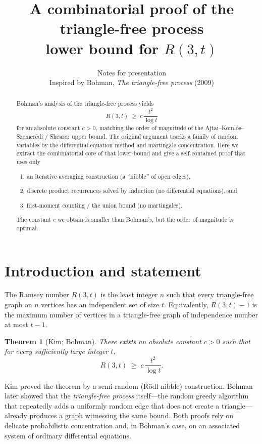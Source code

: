 \documentclass[11pt]{article}
\title{A combinatorial proof of the triangle-free process\\ lower bound for $R(3,t)$}
\author{Notes for presentation\\[0.5em]
\large Inspired by Bohman, \emph{The triangle-free process} (2009)}
\date{}
\newtheorem{theorem}{Theorem}
\theoremstyle{definition}
\begin{document}
\maketitle

\begin{abstract}
Bohman's analysis of the triangle-free process yields
\[
  R(3,t)\;\ge\; c\,\frac{t^{2}}{\log t}
\]
for an absolute constant $c>0$, matching the order of magnitude of the Ajtai--Koml\'os--Szemer\'edi / Shearer upper bound.
The original argument tracks a family of random variables by the differential-equation method and martingale concentration.
Here we extract the combinatorial core of that lower bound and give a self-contained proof that uses only
\begin{enumerate}
  \item an iterative averaging construction (a ``nibble'' of open edges),
  \item discrete product recurrences solved by induction (no differential equations), and
  \item first-moment counting / the union bound (no martingales).
\end{enumerate}
The constant $c$ we obtain is smaller than Bohman's, but the order of magnitude is optimal.
\end{abstract}

\section{Introduction and statement}

The Ramsey number $R(3,t)$ is the least integer $n$ such that every triangle-free graph on $n$ vertices has an independent set of size $t$.
Equivalently, $R(3,t)-1$ is the maximum number of vertices in a triangle-free graph of independence number at most $t-1$.

\begin{theorem}[Kim; Bohman]\label{thm:main}
There exists an absolute constant $c>0$ such that for every sufficiently large integer $t$,
\[
  R(3,t)\;\ge\; c\,\frac{t^{2}}{\log t}.
\]
\end{theorem}

Kim proved the theorem by a semi-random (R\"odl nibble) construction.
Bohman later showed that the \emph{triangle-free process} itself---the random greedy algorithm that repeatedly adds a uniformly random edge that does not create a triangle---already produces a graph witnessing the same bound.
Both proofs rely on delicate probabilistic concentration and, in Bohman's case, on an associated system of ordinary differential equations.
\end{document}
